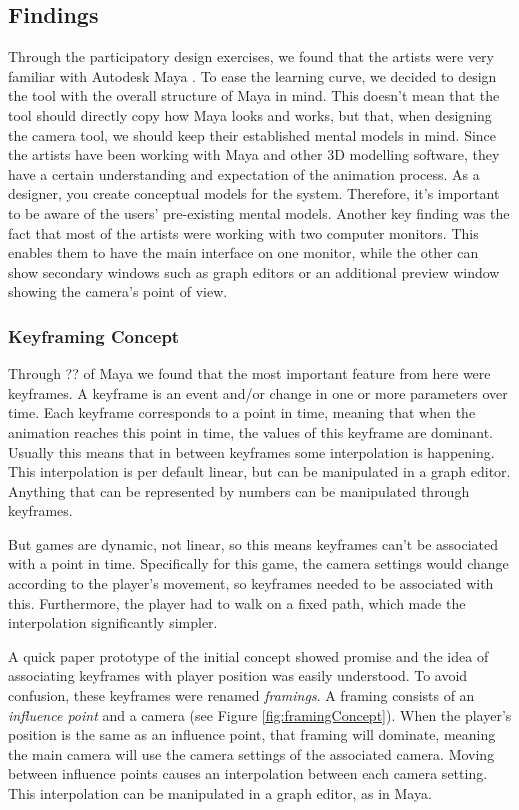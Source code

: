 \subsection{Findings}
Through the participatory design exercises, we found that the artists were very familiar with Autodesk Maya \cite{MayaSource}. To ease the learning curve, we decided to design the tool with the overall structure of Maya in mind. This doesn't mean that the tool should directly copy how Maya looks and works, but that, when designing the camera tool, we should keep their established mental models \cite{mentalModels} in mind. Since the artists have been working with Maya and other 3D modelling software, they have a certain understanding and expectation of the animation process. As a designer, you create conceptual models for the system. Therefore, it's important to be aware of the users' pre-existing mental models. Another key finding was the fact that most of the artists were working with two computer monitors. This enables them to have the main interface on one monitor, while the other can show secondary windows such as graph editors or an additional preview window showing the camera's point of view.

\subsubsection{Keyframing Concept}
Through ?? of Maya we found that the most important feature from here were keyframes.
A keyframe is an event and/or change in one or more parameters over time. Each keyframe corresponds to a point in time, meaning that when the animation reaches this point in time, the values of this keyframe are dominant. Usually this means that in between keyframes some interpolation is happening. This interpolation is per default linear, but can be manipulated in a graph editor. Anything that can be represented by numbers can be manipulated through keyframes.

But games are dynamic, not linear, so this means keyframes can't be associated with a point in time. Specifically for this game, the camera settings would change according to the player's movement, so keyframes needed to be associated with this. Furthermore, the player had to walk on a fixed path, which made the interpolation significantly simpler.

A quick paper prototype of the initial concept showed promise and the idea of associating keyframes with player position was easily understood. To avoid confusion, these keyframes were renamed \textit{framings}. A framing consists of an \textit{influence point} and a camera (see Figure \ref{fig:framingConcept}). When the player's position is the same as an influence point, that framing will dominate, meaning the main camera will use the camera settings of the associated camera. Moving between influence points causes an interpolation between each camera setting. This interpolation can be manipulated in a graph editor, as in Maya.

